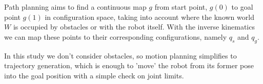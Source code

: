 Path planning aims to find a continuous map $g$ from start point, $g(0)$ to goal point $g(1)$ in configuration space, taking into account where the known world $W$ is occupied by obstacles or with the robot itself. With the inverse kinematics we can map these points to their corresponding configurations, namely $q_s$ and $q_g$.

In this study we don't consider obstacles, so motion planning simplifies to trajectory generation, which is enough to 'move' the robot from its former pose into the goal position with a simple check on joint limits.